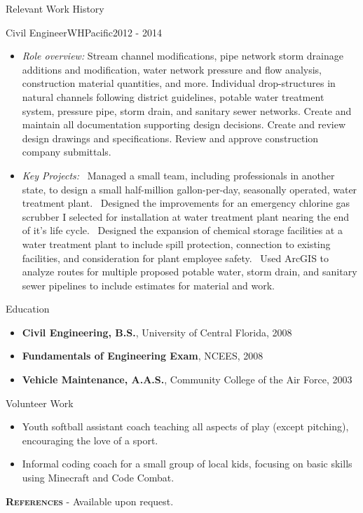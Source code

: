 \documentclass[]{mcdowellcv}
\begin{document}
\begin{cvsection}{Relevant Work History}
\begin{cvsubsection}{Civil Engineer}{WHPacific}{2012 - 2014}
\begin{itemize}
			\item \textit{Role overview:}  
				 Stream channel modifications, pipe network storm drainage additions and modification, water network pressure and flow analysis, construction material quantities, and more.  
				 Individual drop-structures in natural channels following district guidelines, potable water treatment system, pressure pipe, storm drain, and sanitary sewer networks.
				  Create and maintain all documentation supporting design decisions.  Create and review design drawings and specifications.   Review and approve construction company submittals.
			
			\item \textit{Key Projects:}  
				\sbt\ Managed a small team, including professionals in another state, to design a small half-million gallon-per-day, seasonally operated, water treatment plant. 
				\sbt\ Designed the improvements for an emergency chlorine gas scrubber I selected for installation at water treatment plant nearing the end of it's life cycle.
				\sbt\ Designed the expansion of chemical storage facilities at a water treatment plant to include spill protection, connection to existing facilities, and consideration for plant employee safety.
				\sbt\ Used ArcGIS to analyze routes for multiple proposed potable water, storm drain, and sanitary sewer pipelines to include estimates for material and work.
		\end{itemize}
	\end{cvsubsection}
\end{cvsection}
\begin{cvsection}{Education}
	\begin{cvsubsection}{}{}{}
		\begin{itemize}
			\item \textbf{Civil Engineering, B.S.}, University of Central Florida, 2008
			\item \textbf{Fundamentals of Engineering Exam}, NCEES, 2008
			\item \textbf{Vehicle Maintenance, A.A.S.}, Community College of the Air Force, 2003
		\end{itemize}
	\end{cvsubsection}
\end{cvsection}
\begin{cvsection}{Volunteer Work}
	\begin{cvsubsection}{}{}{}
		\begin{itemize}
			\item Youth softball assistant coach teaching all aspects of play (except pitching),  encouraging the love of a sport.
			\item Informal coding coach for a small group of local kids, focusing on basic skills using Minecraft and Code Combat.
		\end{itemize}
	\end{cvsubsection}
\end{cvsection}
\textsc{\textbf{References}} - Available upon request.
\end{document}
